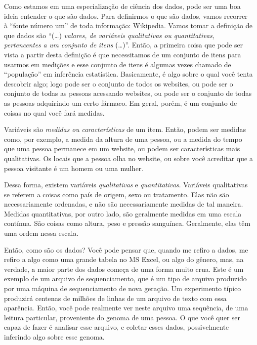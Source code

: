 \begin{multicols}{2}
\begin{footnotesize}
Como estamos em uma especialização de ciência dos dados, pode ser uma boa ideia entender o que são dados. Para definirmos o que são dados, vamos recorrer à ``fonte número um'' de toda informação: Wikipedia. Vamos tomar a definição de que dados são ``(\ldots) \emph{valores, de variáveis qualitativas ou quantitativas, pertencentes a um conjunto de itens} (\ldots)''. Então, a primeira coisa que pode ser vista a partir desta definição é que necessitamos de um conjunto de itens para usarmos em medições e esse conjunto de itens é algumas vezes chamado de ``população'' em inferência estatística. Basicamente, é algo sobre o qual você tenta descobrir algo; logo pode ser o conjunto de todos os websites, ou pode ser o conjunto de todas as pessoas acessando websites, ou pode ser o conjunto de todas as pessoas adquirindo um certo fármaco. Em geral, porém, é um conjunto de coisas no qual você fará medidas.

Variáveis são \emph{medidas ou características} de um item. Então, podem ser medidas como, por exemplo, a medida da altura de uma pessoa, ou a medida do tempo que uma pessoa permanece em um website, ou podem ser características mais qualitativas. Os locais que a pessoa olha no website, ou sobre você acreditar que a pessoa visitante é um homem ou uma mulher.

Dessa forma, existem variáveis \emph{qualitativas} e \emph{quantitativas}. Variáveis qualitativas se referem a coisas como país de origem, sexo ou tratamento. Elas não são necessariamente ordenadas, e não são necessariamente medidas de tal maneira. Medidas quantitativas, por outro lado, são geralmente medidas em uma escala contínua. São coisas como altura, peso e pressão sanguínea. Geralmente, elas têm uma ordem nessa escala.

Então, como são os dados? Você pode pensar que, quando me refiro a dados, me refiro a algo como uma grande tabela no MS Excel, ou algo do gênero, mas, na verdade, a maior parte dos dados começa de uma forma muito crua. Este é um exemplo de um arquivo de sequenciamento, que é um tipo de arquivo produzido por uma máquina de sequenciamento de nova geração. Um experimento típico produzirá centenas de milhões de linhas de um arquivo de texto com essa aparência. Então, você pode realmente ver neste arquivo uma sequência, de uma leitura particular, proveniente do genoma de uma pessoa. O que você quer ser capaz de fazer é analisar esse arquivo, e coletar esses dados, possivelmente inferindo algo sobre esse genoma. 


\end{footnotesize}
\end{multicols}
